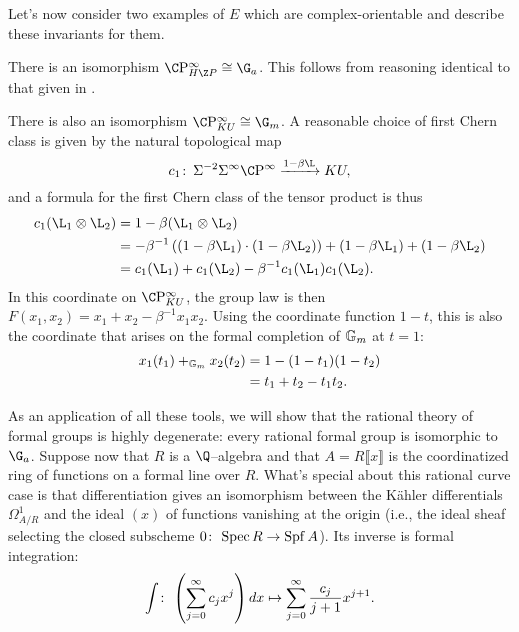 Let's now consider two examples of $E$ which are complex-orientable and describe these invariants for them.

\begin{example}\label{HZGivesGa}
There is an isomorphism $\CP^\infty_{H\Z P} \cong \G_a$.  This follows from reasoning identical to that given in .
\end{example}

\begin{example}\label{CPinftyKUExample}
There is also an isomorphism $\CP^\infty_{KU} \cong \G_m$.  A reasonable choice of first Chern class is given by the natural topological map \[c_1\co \Susp^{-2} \Susp^\infty \CP^\infty \xrightarrow{1 - \beta \L} KU,\] and a formula for the first Chern class of the tensor product is thus
\begin{align*}
c_1(\L_1 \otimes \L_2) & = 1 - \beta(\L_1 \otimes \L_2) \\
& = -\beta^{-1} \left( (1 - \beta \L_1) \cdot (1 - \beta \L_2) \right) + (1 - \beta \L_1) + (1 - \beta \L_2) \\
& = c_1(\L_1) + c_1(\L_2) - \beta^{-1} c_1(\L_1) c_1(\L_2).
\end{align*}
In this coordinate on $\CP^\infty_{KU}$, the group law is then $F(x_1, x_2) = x_1 + x_2 - \beta^{-1} x_1 x_2$.  Using the coordinate function $1 - t$, this is also the coordinate that arises on the formal completion of $\mathbb G_m$ at $t = 1$:
\begin{align*}
x_1(t_1) +_{\mathbb G_m} x_2(t_2) & = 1 - (1 - t_1)(1 - t_2) \\
& = t_1 + t_2 - t_1 t_2.
\end{align*}
\end{example}

As an application of all these tools, we will show that the rational theory of formal groups is highly degenerate: every rational formal group is isomorphic to $\G_a$.  Suppose now that $R$ is a $\Q$--algebra and that $A = R\llbracket x \rrbracket$ is the coordinatized ring of functions on a formal line over $R$.  What's special about this rational curve case is that differentiation gives an isomorphism between the K\"ahler differentials $\Omega^1_{A/R}$ and the ideal $(x)$ of functions vanishing at the origin (i.e., the ideal sheaf selecting the closed subscheme $0\colon\thinspace \operatorname{Spec} R \to \operatorname{Spf} A$).  Its inverse is formal integration: \[\int \colon\thinspace \left(\sum_{j=0}^\infty c_j x^j \right) dx \mapsto \sum_{j=0}^\infty \frac{c_j}{j+1} x^{j+1}.\]

